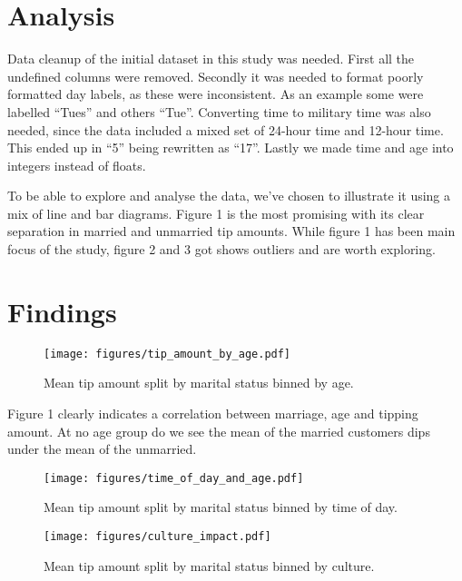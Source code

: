 \documentclass[twoside,twocolumn]{article}
\begin{document}
\section{Analysis}Data cleanup of the initial dataset in this study was needed. First all the undefined columns were removed. Secondly it was needed to format poorly formatted day labels, as these were inconsistent. As an example some were labelled “Tues” and others “Tue”. Converting time to military time was also needed, since the data included a mixed set of 24-hour time and 12-hour time. This ended up in “5” being rewritten as “17”. Lastly we made time and age into integers instead of floats.

To be able to explore and analyse the data, we've chosen to illustrate it using a mix of line and bar diagrams. Figure 1 is the most promising with its clear separation in married and unmarried tip amounts. While figure 1 has been main focus of the study, figure 2 and 3 got shows outliers and are worth exploring.



\section{Findings}

\begin{figure}[h]
  \centering
  \texttt{[image: figures/tip\_amount\_by\_age.pdf]}
  \caption{Mean tip amount split by marital status binned by age.}
  \label{fig:tip-amount-by-age}
\end{figure}

Figure 1 clearly indicates a correlation between marriage, age and tipping amount. At no age group do we see the mean of the married customers dips under the mean of the unmarried.

\begin{figure}[h]
  \centering
  \texttt{[image: figures/time\_of\_day\_and\_age.pdf]}
  \caption{Mean tip amount split by marital status binned by time of day.}
  \label{fig:time-of-day-and-age}
\end{figure}

\begin{figure}[h]
  \centering
  \texttt{[image: figures/culture\_impact.pdf]}
  \caption{Mean tip amount split by marital status binned by culture.}
  \label{fig:culture-impact}
\end{figure}
\end{document}
